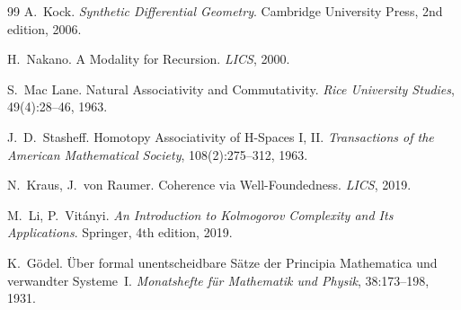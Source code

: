 \documentclass[11pt,a4paper]{article}
\theoremstyle{plain}
\theoremstyle{definition}
\theoremstyle{remark}
\begin{document}
\begin{thebibliography}{99}
A.~Kock.
\textit{Synthetic Differential Geometry}.
Cambridge University Press, 2nd edition, 2006.

H.~Nakano.
A Modality for Recursion.
\textit{LICS}, 2000.

S.~Mac Lane.
Natural Associativity and Commutativity.
\textit{Rice University Studies}, 49(4):28--46, 1963.

J.~D.~Stasheff.
Homotopy Associativity of H-Spaces I, II.
\textit{Transactions of the American Mathematical Society}, 108(2):275--312, 1963.

N.~Kraus, J.~von Raumer.
Coherence via Well-Foundedness.
\textit{LICS}, 2019.

M.~Li, P.~Vit\'anyi.
\textit{An Introduction to Kolmogorov Complexity and Its Applications}.
Springer, 4th edition, 2019.

K.~G\"odel.
\"Uber formal unentscheidbare S\"atze der Principia Mathematica und verwandter Systeme~I.
\textit{Monatshefte f\"ur Mathematik und Physik}, 38:173--198, 1931.

\end{thebibliography}
\end{document}
